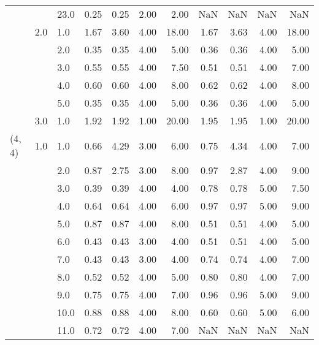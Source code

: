 \begin{tabular}{lllrrrrrrrr}
       &     & 23.0 &       0.25 &      0.25 & 2.00 &   2.00 &        NaN &       NaN &  NaN &    NaN \\
       & 2.0 & 1.0  &       1.67 &      3.60 & 4.00 &  18.00 &       1.67 &      3.63 & 4.00 &  18.00 \\
       &     & 2.0  &       0.35 &      0.35 & 4.00 &   5.00 &       0.36 &      0.36 & 4.00 &   5.00 \\
       &     & 3.0  &       0.55 &      0.55 & 4.00 &   7.50 &       0.51 &      0.51 & 4.00 &   7.00 \\
       &     & 4.0  &       0.60 &      0.60 & 4.00 &   8.00 &       0.62 &      0.62 & 4.00 &   8.00 \\
       &     & 5.0  &       0.35 &      0.35 & 4.00 &   5.00 &       0.36 &      0.36 & 4.00 &   5.00 \\
       & 3.0 & 1.0  &       1.92 &      1.92 & 1.00 &  20.00 &       1.95 &      1.95 & 1.00 &  20.00 \\
(4, 4) & 1.0 & 1.0  &       0.66 &      4.29 & 3.00 &   6.00 &       0.75 &      4.34 & 4.00 &   7.00 \\
       &     & 2.0  &       0.87 &      2.75 & 3.00 &   8.00 &       0.97 &      2.87 & 4.00 &   9.00 \\
       &     & 3.0  &       0.39 &      0.39 & 4.00 &   4.00 &       0.78 &      0.78 & 5.00 &   7.50 \\
       &     & 4.0  &       0.64 &      0.64 & 4.00 &   6.00 &       0.97 &      0.97 & 5.00 &   9.00 \\
       &     & 5.0  &       0.87 &      0.87 & 4.00 &   8.00 &       0.51 &      0.51 & 4.00 &   5.00 \\
       &     & 6.0  &       0.43 &      0.43 & 3.00 &   4.00 &       0.51 &      0.51 & 4.00 &   5.00 \\
       &     & 7.0  &       0.43 &      0.43 & 3.00 &   4.00 &       0.74 &      0.74 & 4.00 &   7.00 \\
       &     & 8.0  &       0.52 &      0.52 & 4.00 &   5.00 &       0.80 &      0.80 & 4.00 &   7.00 \\
       &     & 9.0  &       0.75 &      0.75 & 4.00 &   7.00 &       0.96 &      0.96 & 5.00 &   9.00 \\
       &     & 10.0 &       0.88 &      0.88 & 4.00 &   8.00 &       0.60 &      0.60 & 5.00 &   6.00 \\
       &     & 11.0 &       0.72 &      0.72 & 4.00 &   7.00 &        NaN &       NaN &  NaN &    NaN \\

\end{tabular}

